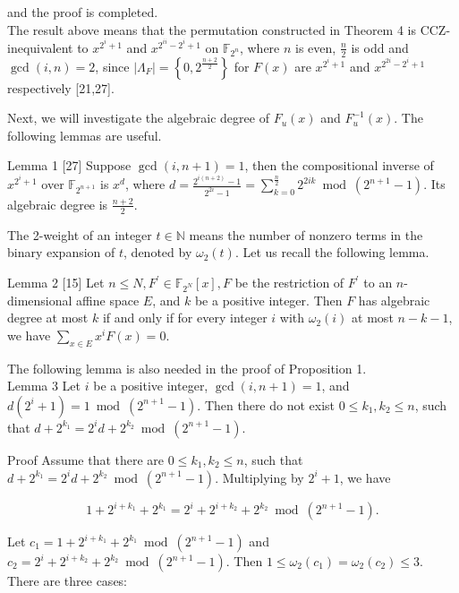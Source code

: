 \documentclass[10pt]{article}
\begin{document}
and the proof is completed.\\
The result above means that the permutation constructed in Theorem 4 is CCZ-inequivalent to $x^{2^{i}+1}$ and $x^{2^{i i}-2^{i}+1}$ on $\mathbb{F}_{2^{n}}$, where $n$ is even, $\frac{n}{2}$ is odd and $\operatorname{gcd}(i, n)=2$, since $\left|\Lambda_{F}\right|=\left\{0,2^{\frac{n+2}{2}}\right\}$ for $F(x)$ are $x^{2^{i}+1}$ and $x^{2^{2 i}-2^{i}+1}$ respectively [21,27].

Next, we will investigate the algebraic degree of $F_{u}(x)$ and $F_{u}^{-1}(x)$. The following lemmas are useful.

Lemma 1 [27] Suppose $\operatorname{gcd}(i, n+1)=1$, then the compositional inverse of $x^{2^{i}+1}$ over $\mathbb{F}_{2^{n+1}}$ is $x^{d}$, where $d=\frac{2^{i(n+2)}-1}{2^{2 i}-1}=\sum_{k=0}^{\frac{n}{2}} 2^{2 i k} \bmod \left(2^{n+1}-1\right)$. Its algebraic degree is $\frac{n+2}{2}$.

The 2-weight of an integer $t \in \mathbb{N}$ means the number of nonzero terms in the binary expansion of $t$, denoted by $\omega_{2}(t)$. Let us recall the following lemma.

Lemma 2 [15] Let $n \leq N, F^{\prime} \in \mathbb{F}_{2^{N}}[x], F$ be the restriction of $F^{\prime}$ to an $n$-dimensional affine space $E$, and $k$ be a positive integer. Then $F$ has algebraic degree at most $k$ if and only if for every integer $i$ with $\omega_{2}(i)$ at most $n-k-1$, we have $\sum_{x \in E} x^{i} F(x)=0$.

The following lemma is also needed in the proof of Proposition 1.\\
Lemma 3 Let $i$ be a positive integer, $\operatorname{gcd}(i, n+1)=1$, and $d\left(2^{i}+1\right)=1 \bmod \left(2^{n+1}-1\right)$. Then there do not exist $0 \leq k_{1}, k_{2} \leq n$, such that $d+2^{k_{1}}=2^{i} d+2^{k_{2}} \bmod \left(2^{n+1}-1\right)$.

Proof Assume that there are $0 \leq k_{1}, k_{2} \leq n$, such that $d+2^{k_{1}}=2^{i} d+2^{k_{2}} \bmod \left(2^{n+1}-1\right)$. Multiplying by $2^{i}+1$, we have


\begin{equation*}
1+2^{i+k_{1}}+2^{k_{1}}=2^{i}+2^{i+k_{2}}+2^{k_{2}} \bmod \left(2^{n+1}-1\right) . \tag{1}
\end{equation*}


Let $c_{1}=1+2^{i+k_{1}}+2^{k_{1}} \bmod \left(2^{n+1}-1\right)$ and $c_{2}=2^{i}+2^{i+k_{2}}+2^{k_{2}} \bmod \left(2^{n+1}-1\right)$. Then $1 \leq \omega_{2}\left(c_{1}\right)=\omega_{2}\left(c_{2}\right) \leq 3$. There are three cases:
\end{document}
